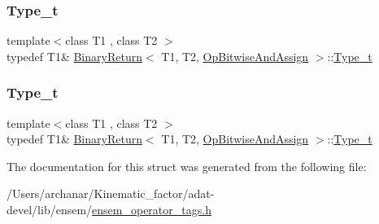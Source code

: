 \mbox{\label{structBinaryReturn_3_01T1_00_01T2_00_01OpBitwiseAndAssign_01_4_af047665bd1eeb8cd1c5b11049e4652a7}} 
\subsubsection{\texorpdfstring{Type\_t}{Type\_t}\hspace{0.1cm}{\footnotesize\ttfamily [2/3]}}
{\footnotesize\ttfamily template$<$class T1 , class T2 $>$ \\
typedef T1\& \mbox{\hyperlink{structBinaryReturn}{Binary\+Return}}$<$ T1, T2, \mbox{\hyperlink{structOpBitwiseAndAssign}{Op\+Bitwise\+And\+Assign}} $>$\+::\mbox{\hyperlink{structBinaryReturn_3_01T1_00_01T2_00_01OpBitwiseAndAssign_01_4_af047665bd1eeb8cd1c5b11049e4652a7}{Type\+\_\+t}}}

\mbox{\label{structBinaryReturn_3_01T1_00_01T2_00_01OpBitwiseAndAssign_01_4_af047665bd1eeb8cd1c5b11049e4652a7}} 
\subsubsection{\texorpdfstring{Type\_t}{Type\_t}\hspace{0.1cm}{\footnotesize\ttfamily [3/3]}}
{\footnotesize\ttfamily template$<$class T1 , class T2 $>$ \\
typedef T1\& \mbox{\hyperlink{structBinaryReturn}{Binary\+Return}}$<$ T1, T2, \mbox{\hyperlink{structOpBitwiseAndAssign}{Op\+Bitwise\+And\+Assign}} $>$\+::\mbox{\hyperlink{structBinaryReturn_3_01T1_00_01T2_00_01OpBitwiseAndAssign_01_4_af047665bd1eeb8cd1c5b11049e4652a7}{Type\+\_\+t}}}



The documentation for this struct was generated from the following file\+:\begin{DoxyCompactItemize}
\item 
/\+Users/archanar/\+Kinematic\+\_\+factor/adat-\/devel/lib/ensem/\mbox{\hyperlink{adat-devel_2lib_2ensem_2ensem__operator__tags_8h}{ensem\+\_\+operator\+\_\+tags.\+h}}\end{DoxyCompactItemize}
